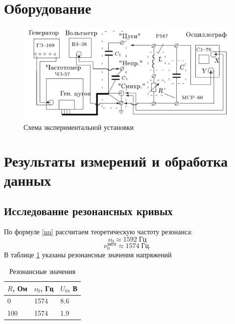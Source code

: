 \documentclass{lab}
\begin{document}
\section{Оборудование}
\begin{figure}[h!]
    \centering
    \includegraphics[width=1\linewidth]{Screenshot_2}
    \caption{Схема экспериментальной установки}
    \label{fig:set}
\end{figure}

\section{Результаты измерений и обработка данных}

\subsection{Исследование резонансных кривых}

По формуле \ref{nu} рассчитаем теоретическую частоту резонанса:
\begin{equation}
    \nu_0\approx 1592 \; \text{Гц}
\end{equation}
\begin{equation}
    \nu_0^\text{эксп} \approx 1574 \; \text{Гц}.
\end{equation}
В таблице \ref{res} указаны резонансные значения напряжений 

\begin{table}[]
    \centering
    \begin{tabular}{|l|l|l|}
        \hline
        \textbf{$R$, Ом} & \textbf{$\nu_0$, Гц} & \textbf{$U_0$, В} \\ \hline
        0                & 1574                 & 8.6               \\ \hline
        100              & 1574                 & 1.9               \\ \hline
    \end{tabular}
    \caption{Резонансные значения}
    \label{res}
\end{table}
\end{document}
